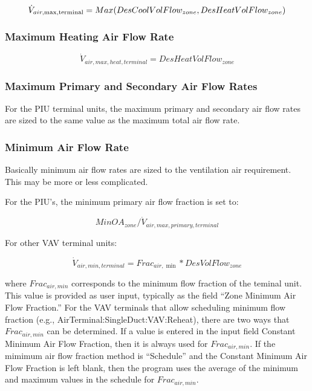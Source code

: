 \begin{equation}
{\dot V_{air,\max ,{\rm{terminal}}}} = Max(DesCoolVolFlow_{zone},DesHeatVolFlow_{zone})
\end{equation}

\subsubsection{Maximum Heating Air Flow Rate}\label{maximum-heating-air-flow-rate}

\begin{equation}
{\dot V_{air,max,heat,terminal}} = DesHeatVolFlow_{zone}
\end{equation}

\subsubsection{Maximum Primary and Secondary Air Flow Rates}\label{maximum-primary-and-secondary-air-flow-rates}

For the PIU terminal units, the maximum primary and secondary air flow rates are sized to the same value as the maximum total air flow rate.

\subsubsection{Minimum Air Flow Rate}\label{minimum-air-flow-rate}

Basically minimum air flow rates are sized to the ventilation air requirement. This may be more or less complicated.

For the PIU's, the minimum primary air flow fraction is set to:

\begin{equation}
{MinOA}\nolimits_{zone} /{\dot V_{air,max,primary,terminal}}
\end{equation}

For other VAV terminal units:

\begin{equation}
{\dot V_{air,min,terminal}} = Fra{c_{air,\min }}*DesVolFlow_{zone}
\end{equation}

where \emph{\(Frac_{air,min}\)} corresponds to the minimum flow fraction of the teminal unit. This value is provided as user input, typically as the field ``Zone Minimum Air Flow Fraction.'' For the VAV terminals that allow scheduling minimum flow fraction (e.g., AirTerminal:SingleDuct:VAV:Reheat), there are two ways that \emph{\(Frac_{air,min}\)} can be determined. If a value is entered in the input field Constant Minimum Air Flow Fraction, then it is always used for \emph{\(Frac_{air,min}\)}. If the mimimum air flow fraction method is ``Schedule'' and the Constant Minimum Air Flow Fraction is left blank, then the program uses the average of the minimum and maximum values in the schedule for \emph{\(Frac_{air,min}\)}.


